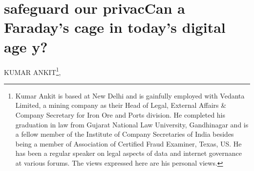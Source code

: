 \chapter{safeguard our privacCan a Faraday’s cage in today’s digital age y?}
\vskip -15pt


\begin{center}
{\large\uppercase{Kumar Ankit}}\footnote{Kumar Ankit is based at New Delhi and is gainfully employed with Vedanta Limited, a mining company as their Head of Legal, External Affairs \& Company Secretary for Iron Ore and Ports division. He completed his graduation in law from Gujarat National Law University, Gandhinagar and is a fellow member of the Institute of Company Secretaries of India besides being a member of Association of Certified Fraud Examiner, Texas, US. He has been a regular speaker on legal aspects of data and internet governance at various forums. The views expressed here are his personal views.}, 


\end{center}

\vskip 2.3cm



\vfill
\newpage

